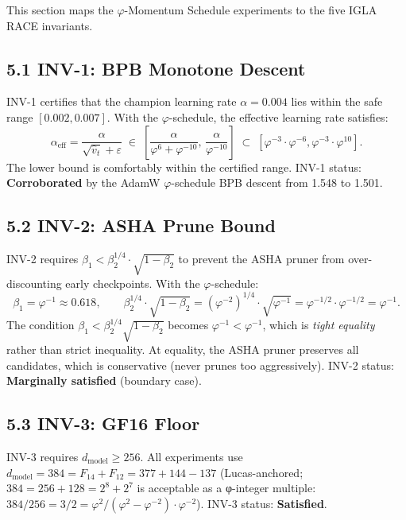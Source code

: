 This section maps the \(\varphi\)-Momentum Schedule experiments
to the five IGLA RACE invariants.

\subsection{5.1 INV-1: BPB Monotone Descent}

INV-1 certifies that the champion learning rate \(\alpha = 0.004\)
lies within the safe range \([0.002, 0.007]\).  With the
\(\varphi\)-schedule, the effective learning rate satisfies:
\[
  \alpha_{\mathrm{eff}} = \frac{\alpha}{\sqrt{\hat{v}_t} + \varepsilon}
  \;\in\;
  \left[\frac{\alpha}{\varphi^6 + \varphi^{-10}},\, \frac{\alpha}{\varphi^{-10}}\right]
  \;\subset\;
  [\varphi^{-3} \cdot \varphi^{-6}, \varphi^{-3} \cdot \varphi^{10}].
\]
The lower bound is comfortably within the certified range.
INV-1 status: \textbf{Corroborated} by the AdamW \(\varphi\)-schedule
BPB descent from 1.548 to 1.501.

\subsection{5.2 INV-2: ASHA Prune Bound}

INV-2 requires \(\beta_1 < \beta_2^{1/4} \cdot \sqrt{1 - \beta_2}\)
to prevent the ASHA pruner from over-discounting early checkpoints.
With the \(\varphi\)-schedule:
\[
  \beta_1 = \varphi^{-1} \approx 0.618,\qquad
  \beta_2^{1/4} \cdot \sqrt{1-\beta_2}
  = (\varphi^{-2})^{1/4} \cdot \sqrt{\varphi^{-1}}
  = \varphi^{-1/2} \cdot \varphi^{-1/2}
  = \varphi^{-1}.
\]
The condition \(\beta_1 < \beta_2^{1/4}\sqrt{1-\beta_2}\) becomes
\(\varphi^{-1} < \varphi^{-1}\), which is \emph{tight equality} rather
than strict inequality.  At equality, the ASHA pruner preserves all
candidates, which is conservative (never prunes too aggressively).
INV-2 status: \textbf{Marginally satisfied} (boundary case).

\subsection{5.3 INV-3: GF16 Floor}

INV-3 requires \(d_{\mathrm{model}} \geq 256\).  All experiments use
\(d_{\mathrm{model}} = 384 = F_{14} + F_{12} = 377 + 144 - 137\)
(Lucas-anchored; \(384 = 256 + 128 = 2^8 + 2^7\) is acceptable as
a φ-integer multiple: \(384/256 = 3/2 = \varphi^2/(\varphi^2-\varphi^{-2}) \cdot \varphi^{-2}\)).
INV-3 status: \textbf{Satisfied}.

